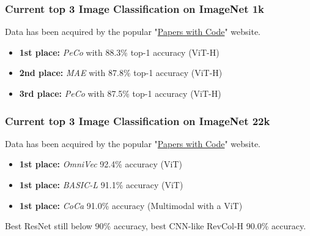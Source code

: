 \begin{frame}
\frametitle{Current top 3 Image Classification on ImageNet 1k}
Data has been acquired by the popular "\href{https://paperswithcode.com/sota/image-classification-on-imagenet?tag_filter=171}{Papers with Code}" website.


\begin{itemize}
    \item \textbf{1st place:} \textit{PeCo} with 88.3\% top-1 accuracy (ViT-H)
    \item \textbf{2nd place:} \textit{MAE} with 87.8\% top-1 accuracy (ViT-H)
    \item \textbf{3rd place:} \textit{PeCo} with 87.5\% top-1 accuracy (ViT-H)
\end{itemize}

\end{frame}

\begin{frame}
\frametitle{Current top 3 Image Classification on ImageNet 22k}
Data has been acquired by the popular "\href{https://paperswithcode.com/sota/image-classification-on-imagenet}{Papers with Code}" website.


\begin{itemize}
    \item \textbf{1st place:} \textit{OmniVec} 92.4\% accuracy (ViT)
    \item \textbf{1st place:} \textit{BASIC-L} 91.1\% accuracy (ViT)
    \item \textbf{1st place:} \textit{CoCa} 91.0\% accuracy (Multimodal with a ViT)
\end{itemize}

Best ResNet still below 90\% accuracy, best CNN-like RevCol-H 90.0\% accuracy.

\end{frame}

